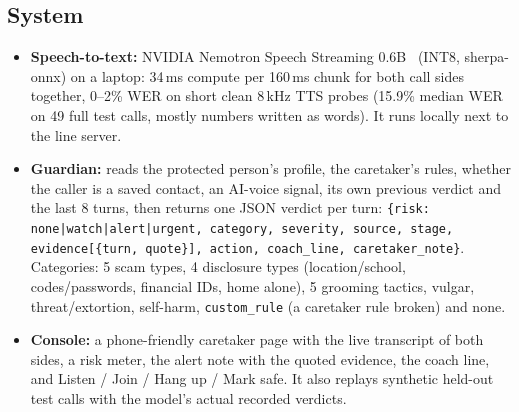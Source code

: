 \documentclass[11pt]{article}
\begin{document}
\subsection{System}
\begin{center}
\end{center}
\begin{itemize}
\item \textbf{Speech-to-text:} NVIDIA Nemotron Speech Streaming 0.6B~\cite{nemospeech} (INT8, sherpa-onnx) on a laptop: 34\,ms compute per 160\,ms chunk for both call sides together, 0--2\% WER on short clean 8\,kHz TTS probes (15.9\% median WER on 49 full test calls, mostly numbers written as words). It runs locally next to the line server.
\item \textbf{Guardian:} reads the protected person's profile, the caretaker's rules, whether the caller is a saved contact, an AI-voice signal, its own previous verdict and the last 8 turns, then returns one JSON verdict per turn:
\texttt{\{risk: none|watch|alert|urgent, category, severity, source, stage, evidence[\{turn, quote\}], action, coach\_line, caretaker\_note\}}.
Categories: 5 scam types, 4 disclosure types (location/school, codes/passwords, financial IDs, home alone), 5 grooming tactics, vulgar, threat/extortion, self-harm, \texttt{custom\_rule} (a caretaker rule broken) and none.
\item \textbf{Console:} a phone-friendly caretaker page with the live transcript of both sides, a risk meter, the alert note with the quoted evidence, the coach line, and Listen / Join / Hang up / Mark safe. It also replays synthetic held-out test calls with the model's actual recorded verdicts.
\end{itemize}
\end{document}
